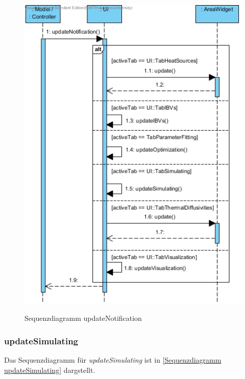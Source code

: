 \begin{figure}[H]
	\centering
	\includegraphics[scale=.6]{Bilder/Ui__updateNotification().jpg}\\
	\caption{Sequenzdiagramm updateNotification}
	\label{Sequenzdiagramm updateNotification}
\end{figure}

\subsubsection*{updateSimulating}

Das Sequenzdiagramm für \emph{updateSimulating} ist in \ref{Sequenzdiagramm updateSimulating} dargstellt.

